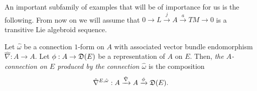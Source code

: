 An important subfamily of examples that will be of importance for us is the following. From now on we will assume that $0 \to L \xrightarrow{j} A \xrightarrow{a} TM \to 0$ is a transitive Lie algebroid sequence.

\begin{definition}
Let $\hat \omega$ be a connection $1$-form on $A$ with associated vector bundle endomorphism $\hat \nabla:A \to A$. Let $\phi: A \to \alg D(E)$ be a representation of $A$ on $E$. Then, \emph{the $A$-connection on $E$ produced by the connection $\hat \omega$} is the composition
\begin{equation}
    \hat \nabla^{E, \hat \omega} : A \xrightarrow{\hat \nabla} A \xrightarrow{\phi} \alg D(E).
\end{equation}
\end{definition}


